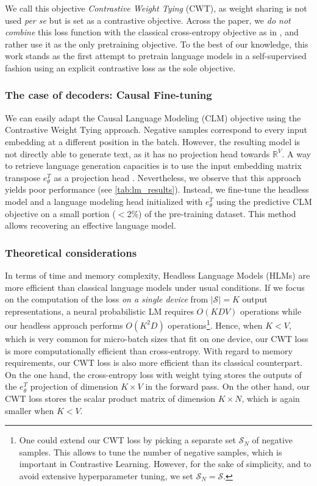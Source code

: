 We call this objective \textit{Contrastive Weight Tying} (CWT), as weight sharing is not used \textit{per se} but is set as a contrastive objective. Across the paper, we \textit{do not combine} this loss function with the classical cross-entropy objective as in \citet{su2022contrastive}, and rather use it as the only pretraining objective. To the best of our knowledge, this work stands as the first attempt to pretrain language models in a self-supervised fashion using an explicit contrastive loss as the sole objective.

\subsubsection{The case of decoders: Causal Fine-tuning}
\label{sec:causal_fine-tuning}

We can easily adapt the Causal Language Modeling (CLM) objective using the Contrastive Weight Tying approach. Negative samples correspond to every input embedding at a different position in the batch. However, the resulting model is not directly able to generate text, as it has no projection head towards $\mathbb{R}^V$. A way to retrieve language generation capacities is to use the input embedding matrix transpose $e_{\theta}^T$ as a projection head \citep{kumar2018vmf,tokarchuk-niculae-2022-target}. Nevertheless, we observe that this approach yields poor performance (see \autoref{tab:lm_results}). Instead, we fine-tune the headless model and a language modeling head initialized with $e_{\theta}^T$ using the predictive CLM objective on a small portion ($<$2\%) of the pre-training dataset. This method allows recovering an effective language model.

\subsubsection{Theoretical considerations}
\label{sec:theory}
In terms of time and memory complexity, Headless Language Models (HLMs) are more efficient than classical language models under usual conditions. If we focus on the computation of the loss \textit{on a single device} from $|\mathcal{S}| = K$ output representations, a neural probabilistic LM requires $O(KDV)$ operations while our headless approach performs $O(K^2D)$ operations\footnote{One could extend our CWT loss by picking a separate set $\mathcal{S}_N$ of negative samples. This allows to tune the number of negative samples, which is important in Contrastive Learning. However, for the sake of simplicity, and to avoid extensive hyperparameter tuning, we set $\mathcal{S}_N = \mathcal{S}$.}. Hence, when $K < V$, which is very common for micro-batch sizes that fit on one device, our CWT loss is more computationally efficient than cross-entropy. 
%
With regard to memory requirements, our CWT loss is also more efficient than its classical counterpart. On the one hand, the cross-entropy loss with weight tying stores the outputs of the $e_\theta^T$ projection of dimension $K \times V$ in the forward pass. On the other hand, our CWT loss stores the scalar product matrix of dimension $K \times N$, which is again smaller when $K < V$.

